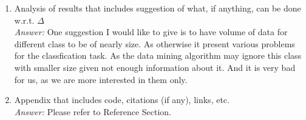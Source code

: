 \documentclass{article}
\begin{document}
\begin{enumerate}
		\item Analysis of results that includes suggestion of what, if anything, can be done w.r.t. $\Delta$\\
		\emph{Answer:} One suggestion I would like to give is to have volume of data for different class to be of  nearly size. As otherwise it present various problems for the classfication task. As the data mining algorithm may ignore this class with smaller size given not enough information about it. And it is very bad for us, as we are more interested in them only.

		\item Appendix that includes code, citations (if any), links, etc.\\
		\emph{Answer:} Please refer to Reference Section.
	\end{enumerate}	
\end{document}
